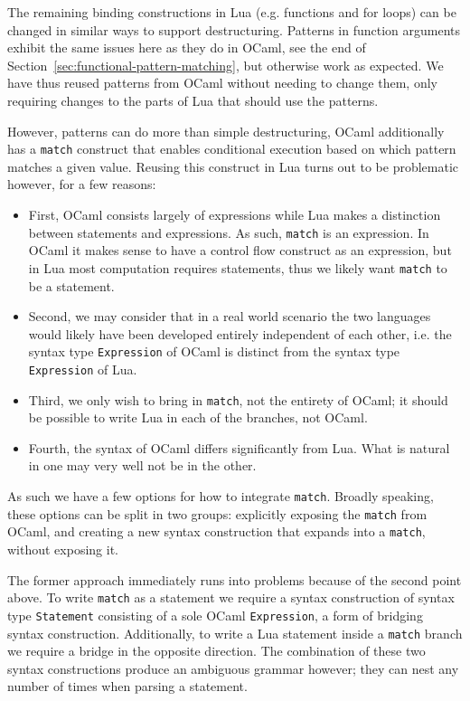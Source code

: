 \documentclass{kththesis}
\begin{document}
The remaining binding constructions in Lua (e.g. functions and for loops) can be changed in similar ways to support destructuring. Patterns in function arguments exhibit the same issues here as they do in OCaml, see the end of Section~\ref{sec:functional-pattern-matching}, but otherwise work as expected. We have thus reused patterns from OCaml without needing to change them, only requiring changes to the parts of Lua that should use the patterns.

However, patterns can do more than simple destructuring, OCaml additionally has a \texttt{match} construct that enables conditional execution based on which pattern matches a given value. Reusing this construct in Lua turns out to be problematic however, for a few reasons:

\begin{itemize}
\item First, OCaml consists largely of expressions while Lua makes a distinction between statements and expressions. As such, \texttt{match} is an expression. In OCaml it makes sense to have a control flow construct as an expression, but in Lua most computation requires statements, thus we likely want \texttt{match} to be a statement.

\item Second, we may consider that in a real world scenario the two languages would likely have been developed entirely independent of each other, i.e. the syntax type \texttt{Expression} of OCaml is distinct from the syntax type \texttt{Expression} of Lua.

\item Third, we only wish to bring in \texttt{match}, not the entirety of OCaml; it should be possible to write Lua in each of the branches, not OCaml.

\item Fourth, the syntax of OCaml differs significantly from Lua. What is natural in one may very well not be in the other.
\end{itemize}

As such we have a few options for how to integrate \texttt{match}. Broadly speaking, these options can be split in two groups: explicitly exposing the \texttt{match} from OCaml, and creating a new syntax construction that expands into a \texttt{match}, without exposing it.

The former approach immediately runs into problems because of the second point above. To write \texttt{match} as a statement we require a syntax construction of syntax type \texttt{Statement} consisting of a sole OCaml \texttt{Expression}, a form of bridging syntax construction. Additionally, to write a Lua statement inside a \texttt{match} branch we require a bridge in the opposite direction. The combination of these two syntax constructions produce an ambiguous grammar however; they can nest any number of times when parsing a statement.
\end{document}
